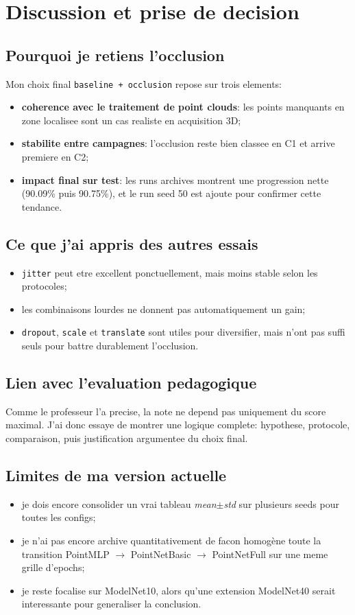 \chapter{Discussion et prise de decision}

\section{Pourquoi je retiens l'occlusion}
Mon choix final \texttt{baseline + occlusion} repose sur trois elements:
\begin{itemize}
  \item \textbf{coherence avec le traitement de point clouds}: les points manquants en zone localisee sont un cas realiste en acquisition 3D;
  \item \textbf{stabilite entre campagnes}: l'occlusion reste bien classee en C1 et arrive premiere en C2;
  \item \textbf{impact final sur test}: les runs archives montrent une progression nette (90.09\% puis 90.75\%), et le run seed 50 est ajoute pour confirmer cette tendance.
\end{itemize}

\section{Ce que j'ai appris des autres essais}
\begin{itemize}
  \item \texttt{jitter} peut etre excellent ponctuellement, mais moins stable selon les protocoles;
  \item les combinaisons lourdes ne donnent pas automatiquement un gain;
  \item \texttt{dropout}, \texttt{scale} et \texttt{translate} sont utiles pour diversifier, mais n'ont pas suffi seuls pour battre durablement l'occlusion.
\end{itemize}

\section{Lien avec l'evaluation pedagogique}
Comme le professeur l'a precise, la note ne depend pas uniquement du score maximal.
J'ai donc essaye de montrer une logique complete: hypothese, protocole, comparaison, puis justification argumentee du choix final.

\section{Limites de ma version actuelle}
\begin{itemize}
  \item je dois encore consolider un vrai tableau \emph{mean\(\pm\)std} sur plusieurs seeds pour toutes les configs;
  \item je n'ai pas encore archive quantitativement de facon homogène toute la transition PointMLP \(\rightarrow\) PointNetBasic \(\rightarrow\) PointNetFull sur une meme grille d'epochs;
  \item je reste focalise sur ModelNet10, alors qu'une extension ModelNet40 serait interessante pour generaliser la conclusion.
\end{itemize}
